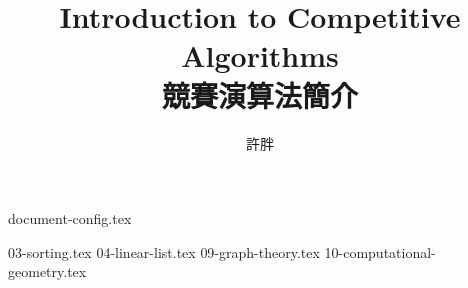 \documentclass[12pt,a4paper,oneside]{book}
\begin{document}
\begin{CJK}{UTF8}{bkai}

{document-config.tex}
\title{Introduction to Competitive Algorithms\\競賽演算法簡介}
\author{許胖}
\maketitle
\tableofcontents

\setcounter{chapter}{2}
{03-sorting.tex}
{04-linear-list.tex}
\setcounter{chapter}{8}
{09-graph-theory.tex}
{10-computational-geometry.tex}

\printindex[noun]

\listoffigures
\clearpage
\end{CJK}
\end{document}
